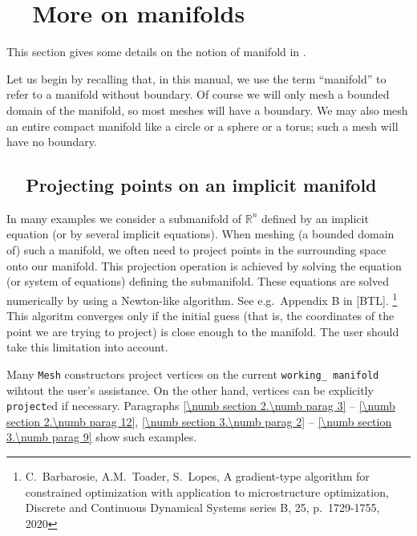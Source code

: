 
\chapter{~~More on manifolds}\label{\numb section 8}

This section gives some details on the notion of manifold in \maniFEM.

Let us begin by recalling that, in this manual, we use the term ``manifold'' to refer to
a manifold without boundary.
Of course we will only mesh a bounded domain of the manifold, so most meshes will have a boundary.
We may also mesh an entire compact manifold like a circle or a sphere or a torus;
such a mesh will have no boundary.


\section{~~Projecting points on an implicit manifold}\label{\numb section 8.\numb parag 1}

In many examples we consider a submanifold of $ \mathbb{R}^n $ defined by an implicit equation
(or by several implicit equations).
When meshing (a bounded domain of) such a manifold, we often need to project points in
the surrounding space onto our manifold. This projection operation is achieved by solving
the equation (or system of equations) defining the submanifold.
These equations are solved numerically by using a Newton-like algorithm.
See e.g.\ Appendix B in [BTL].%
\footnote{C.~Barbarosie, A.M.~Toader, S.~Lopes, A gradient-type algorithm for constrained
optimization with application to microstructure optimization, Discrete and Continuous Dynamical
Systems series B, 25, p.\ 1729-1755, 2020}
This algoritm converges only if the initial guess (that is, the coordinates of the point we are
trying to project) is close enough to the manifold.
The user should take this limitation into account.

Many {\small\tt Mesh} constructors project vertices on the current {\small\tt working\_\,manifold}
wihtout the user's assistance.
On the other hand, vertices can be explicitly {\small\tt project}ed if necessary.
Paragraphs \ref{\numb section 2.\numb parag 3} -- \ref{\numb section 2.\numb parag 12},
\ref{\numb section 3.\numb parag 2} -- \ref{\numb section 3.\numb parag 9} show such examples.
